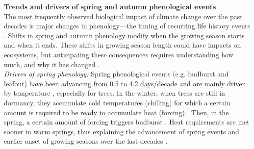 \documentclass{article}
\begin{document}
\textbf{Trends and drivers of spring and autumn phenological events} \\ 
The most frequently observed biological impact of climate change over the past decades is major changes in phenology---the timing of recurring life history events                                                                                                                                                                                                                                                                                                                                                                                                                                     \citep{parmesan_globally_2003,cleland_shifting_2007,lieth_phenology_1974,woolway_phenological_2021,menzel_european_2006}.  Shifts in spring and autumn phenology modify when the growing season starts and when it ends. These shifts in growing season length could have impacts on ecosystems, but anticipating these consequences requires understanding how much, and why it has changed \citep{duputie_phenological_2015}. \\ 

\textit{Drivers of spring phenology:} Spring phenological events (e.g. budburst and leafout) have been advancing from 0.5 \citep{wolfe_climate_2005} to 4.2 days/decade \citep{chmielewski_response_2001,fu_recent_2014} and are mainly driven by temperature \citep{chuine_why_2010,cleland_shifting_2007,penuelas_responses_2001}, especially for trees. In the winter, when trees are still in dormancy, they accumulate cold temperatures (chilling) for which a certain amount is required to be ready to accumulate heat (forcing) \citep{vitasse_interaction_2014}. Then, in the spring, a certain amount of forcing triggers budburst \citep{fu_declining_2015}. Heat requirements are met sooner in warm springs, thus explaining the advancement of spring events and earlier onset of growing seasons over the last decades \citep{fu_declining_2015,fu_sensitivity_2013, laube_chilling_2014}. \\ 
\end{document}
